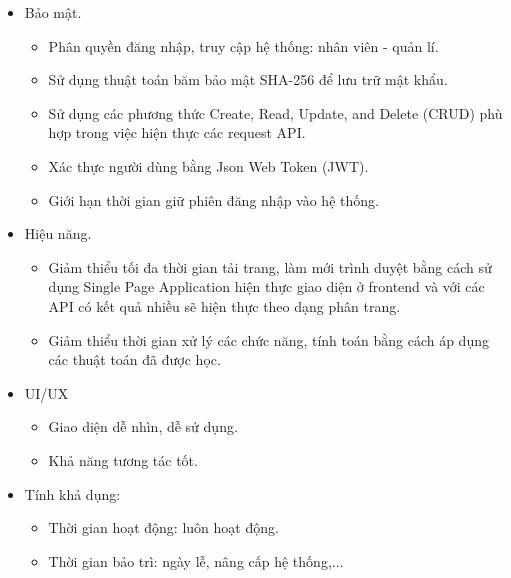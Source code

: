 \begin{itemize}
    \item Bảo mật.
    \begin{itemize}
        \item Phân quyền đăng nhập, truy cập hệ thống: nhân viên - quản lí.
        \item Sử dụng thuật toán băm bảo mật SHA-256 để lưu trữ mật khẩu.
        \item Sử dụng các phương thức Create, Read, Update, and Delete (CRUD) phù hợp trong việc hiện thực các request API.
        \item Xác thực người dùng bằng Json Web Token (JWT).
        \item Giới hạn thời gian giữ phiên đăng nhập vào hệ thống.
    \end{itemize}
    \item Hiệu năng.
    \begin{itemize}
        \item Giảm thiểu tối đa thời gian tải trang, làm mới trình duyệt bằng cách sử dụng Single Page Application hiện thực giao diện ở frontend và với các API có kết quả nhiều sẽ hiện thực theo dạng phân trang.
        \item Giảm thiểu thời gian xử lý các chức năng, tính toán bằng cách áp dụng các thuật toán đã được học.
    \end{itemize}
    \item UI/UX
    \begin{itemize}
        \item Giao diện dễ nhìn, dễ sử dụng.
        \item Khả năng tương tác tốt.
    \end{itemize}
    \item Tính khả dụng:  
    \begin{itemize}
        \item Thời gian hoạt động: luôn hoạt động.
        \item Thời gian bảo trì: ngày lễ, nâng cấp hệ thống,...
    \end{itemize}
\end{itemize}